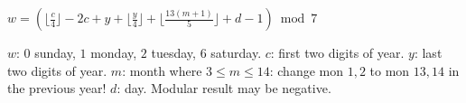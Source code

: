 $w=(\lfloor\frac{c}{4}\rfloor-2c+y+\lfloor\frac{y}{4}\rfloor+\lfloor\frac{13(m+1)}{5}\rfloor+d-1)\bmod 7$\par
$w$: $0$ sunday, $1$ monday, $2$ tuesday, $6$ saturday. $c$: first two digits of year. $y$: last two digits of year. $m$: month where $3\le m\le 14$: change mon $1,2$ to mon $13,14$ in the previous year! $d$: day. Modular result may be negative.
